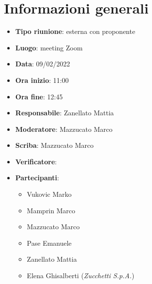 \section{Informazioni generali}
\begin{itemize}
  \item \textbf{Tipo riunione}: esterna con proponente
  \item \textbf{Luogo}: meeting Zoom
  \item \textbf{Data}: 09/02/2022
  \item \textbf{Ora inizio}: 11:00
  \item \textbf{Ora fine}: 12:45
  \item \textbf{Responsabile}: Zanellato Mattia
  \item \textbf{Moderatore}: Mazzucato Marco
  \item \textbf{Scriba}: Mazzucato Marco
  \item \textbf{Verificatore}:
  \item \textbf{Partecipanti}:
  \begin{itemize}
    \item Vukovic Marko
    \item Mamprin Marco
    \item Mazzucato Marco
    \item Pase Emanuele
    \item Zanellato Mattia
    \item Elena Ghisalberti (\textit{Zucchetti S.p.A.})
  \end{itemize}
\end{itemize}
